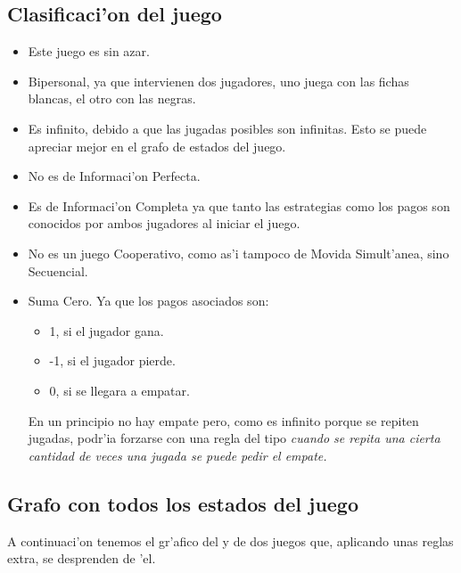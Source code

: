 \subsection{Clasificaci'on del juego}
\begin{itemize}
\item Este juego es sin azar.

\item Bipersonal, ya que intervienen dos jugadores, uno juega con las fichas blancas, el otro con las negras.

\item Es infinito, debido a que las jugadas posibles son infinitas. Esto se puede apreciar mejor en el grafo de estados del juego.

\item No es de Informaci'on Perfecta.

\item Es de Informaci'on Completa ya que tanto las estrategias como los pagos son conocidos por ambos jugadores al iniciar el juego.

\item No es un juego Cooperativo, como as'i tampoco de Movida Simult'anea, sino Secuencial.

\item Suma Cero. Ya que los pagos asociados son:
\begin{itemize}
\item 1, si el jugador gana.
\item -1, si el jugador pierde.
\item 0, si se llegara a empatar.
\end{itemize}
En un principio no hay empate pero, como es infinito porque se repiten jugadas, podr'ia forzarse con una regla del tipo \it{cuando se repita una cierta cantidad de veces una jugada se puede pedir el empate}.
\end{itemize}


\subsection{Grafo con todos los estados del juego}

A continuaci'on tenemos el gr'afico del  y de dos juegos que, aplicando unas reglas extra, se desprenden de 'el.

